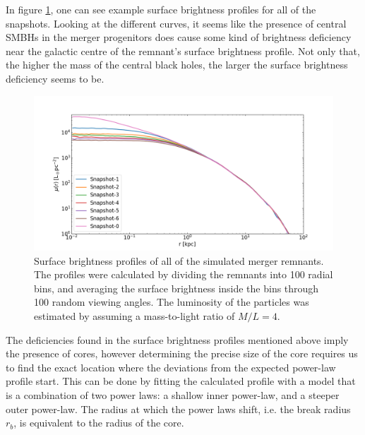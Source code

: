 \documentclass[english, oneside]{HYgradu}
\begin{document}
In figure \ref{figure:surface_brightness}, one can see example surface brightness profiles for all of the snapshots. Looking at the different curves, it seems like the presence of central SMBHs in the merger progenitors does cause some kind of brightness deficiency near the galactic centre of the remnant's surface brightness profile. Not only that, the higher the mass of the central black holes, the larger the surface brightness deficiency seems to be.

\begin{figure}[h]
	\centering
	\includegraphics[width=\textwidth]{SurfaceBrightnessProfiles.png}
	\caption{Surface brightness profiles of all of the simulated merger remnants. The profiles were calculated by dividing the remnants into 100 radial bins, and averaging the surface brightness inside the bins through 100 random viewing angles. The luminosity of the particles was estimated by assuming a mass-to-light ratio of $M/L = 4$.}
	\label{figure:surface_brightness}
\end{figure}

The deficiencies found in the surface brightness profiles mentioned above imply the presence of cores, however determining the precise size of the core requires us to find the exact location where the deviations from the expected power-law profile start. This can be done by fitting the calculated profile with a model that is a combination of two power laws: a shallow inner power-law, and a steeper outer power-law. The radius at which the power laws shift, i.e. the break radius $r_b$, is equivalent to the radius of the core. 
\end{document}
